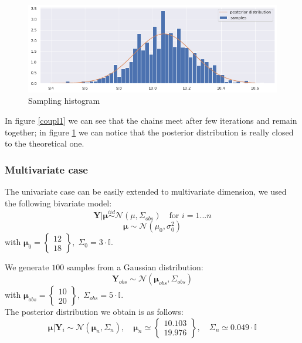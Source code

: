 \documentclass {article}
\begin{document}
	\begin{figure}[h!]
		\centering
		\includegraphics[width=\textwidth]{immagini_coupling/hist_coupling}
		\caption{Sampling histogram}
		\label{coupl3}
	\end{figure}


In figure \ref{coupl1} we can see that the chains meet after few iterations and remain together; in figure \ref{coupl3} we can notice that the posterior distribution is really closed to the theoretical one.

\newpage

\subsubsection{Multivariate case}

The univariate case can be easily extended to multivariate dimension, we used the following bivariate model:
$$ \boldsymbol{Y} | \boldsymbol{\mu} \overset{iid}{\sim} \mathcal{N}(\mu, \Sigma_{obs} ) \quad \text{for } i = 1 ... n $$
$$ \boldsymbol{\mu}  \sim \mathcal{N}(\mu_0, \sigma_0^2)$$
with $\boldsymbol{\mu}_0 =
\begin{Bmatrix}    %
12 \\
18
\end{Bmatrix} 
, \; \Sigma_0 = 3 \cdot \mathbb{I}$.

We generate $100$ samples from a Gaussian distribution:
$$
\boldsymbol{Y}_{obs} \sim \mathcal{N}(\boldsymbol{\mu}_{obs}, \Sigma_{obs})
$$
with
$  \boldsymbol{\mu}_{obs} =
\begin{Bmatrix}  
	10 \\
 	20
\end{Bmatrix}  
, \;  \Sigma_{obs}  = 5 \cdot \mathbb{I}
$.\\

The posterior distribution we obtain is as follows:
$$  \boldsymbol{\mu} | \boldsymbol{Y}_i \sim \mathcal{N}(\boldsymbol{\mu}_n, \Sigma_n), 
\quad \boldsymbol{\mu}_n \simeq \begin{Bmatrix}    %
10.103 \\
19.976
\end{Bmatrix} ,
\quad
\Sigma_n
\simeq 0.049 \cdot \mathbb{I} $$
\end{document}
